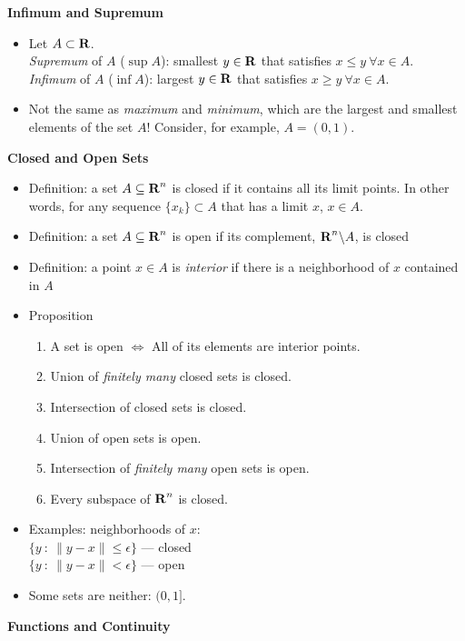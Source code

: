 \documentclass[11pt]{article}
\begin{document}
\begin{center}
\textbf{Infimum and Supremum}
\end{center}
\begin{itemize}
\item Let $A\subset{\mbox{\textbf{R}}}$.\\
\emph{Supremum} of $A$ ($\sup A$): smallest $y\in{\mbox{\textbf{R}}}$ that satisfies $x\le y\ \forall x\in A$.\\
\emph{Infimum} of $A$ ($\inf A$): largest $y\in{\mbox{\textbf{R}}}$ that satisfies $x\ge y\ \forall x\in A$.
\item Not the same as \emph{maximum} and \emph{minimum}, which are the largest and smallest elements of the set $A$! Consider, for example, $A=(0,1)$.
\end{itemize}
\begin{center}
\textbf{Closed and Open Sets}
\end{center}
\begin{itemize}
\item Definition: a set $A\subseteq {\mbox{\textbf{R}}}^n$ is closed if it contains all its limit points. In other words, for any sequence $\{x_k\}\subset A$ that has a limit $x$, $x\in A$.
\item Definition: a set $A\subseteq {\mbox{\textbf{R}}}^n$ is open if its complement, ${\mbox{\textbf{R}}}^n\backslash A$, is closed
\item Definition: a point $x\in A$ is \emph{interior} if there is a neighborhood of $x$ contained in $A$
\item Proposition\begin{enumerate}
\item A set is open $\Leftrightarrow$ All of its elements are interior points.
\item Union of \emph{finitely many} closed sets is closed.
\item Intersection of closed sets is closed.
\item Union of open sets is open.
\item Intersection of \emph{finitely many} open sets is open.
\item Every subspace of ${\mbox{\textbf{R}}}^n$ is closed.
\end{enumerate}
\item Examples: neighborhoods of $x$:\\
$\{y\ :\ \|y-x\|\le\epsilon\}$ --- closed\\
$\{y\ :\ \|y-x\|<\epsilon\}$ --- open
\item Some sets are neither: $(0,1]$.
\end{itemize}
\begin{center}
\textbf{Functions and Continuity}
\end{center}
\end{document}
